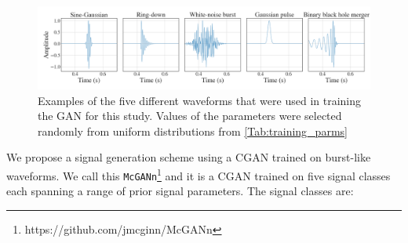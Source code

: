 \documentclass[12pt]{iopart}
\begin{document}
%
\begin{figure}
    \centering
    \includegraphics[width=\textwidth]{figures/training-sample.png}
    \caption{Examples of the five different waveforms that were used in training the \ac{GAN} for this study. Values of the parameters were selected randomly from uniform distributions from \cref{Tab:training_parms}}
    \label{fig:training_waveforms}
\end{figure}
%
We propose a signal generation scheme using a \ac{CGAN} trained on burst-like
waveforms. We call this \texttt{McGANn}\footnote{https://github.com/jmcginn/McGANn} and it is a \ac{CGAN} trained on five signal classes each spanning a range
of prior signal parameters. The signal classes are:
\end{document}
